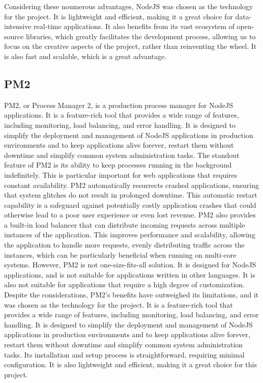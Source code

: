 Considering these noumerous advantages, NodeJS was chosen as the technology for the project. It is lightweight and efficient, making it a great choice for data-intensive real-time applications. It also benefits from its vast ecosystem of open-source libraries, which greatly facilitates the development process, allowing us to focus on the creative aspects of the project, rather than reinventing the wheel. It is also fast and scalable, which is a great advantage.


\subsection{PM2}
PM2, or Process Manager 2, is a production process manager for NodeJS applications. It is a feature-rich tool that provides a wide range of features, including monitoring, load balancing, and error handling. It is designed to simplify the deployment and management of NodeJS applications in production environments and to keep applications alive forever, restart
them without downtime and simplify common system administration tasks.
The standout feature of PM2 is its ability to keep processes running in the background indefinitely. This is particular important for web applications that requires constant availability. PM2 automatically resurrects crashed applications, ensuring that system glitches do not result in prolonged downtime.\cite{pm2}
This automatic restart capability is a safeguard against potentially costly application crashes that could otherwise lead to a poor user experience or even lost revenue. \cite{pm2}
PM2 also provides a built-in load balancer that can distribute incoming requests across multiple instances of the application. This improves performance and scalability, allowing the application to handle more requests, evenly distributing traffic across the instances, which can be particularly beneficial when running on multi-core systems. \cite{pm2LoadBalancing}
However, PM2 is not one-size-fits-all solution. It is designed for NodeJS applications, and is not suitable for applications written in other languages. It is also not suitable for applications that require a high degree of customization. \cite{pm2}
Despite the considerations, PM2's benefits have outweighed its limitations, and it was chosen as the technology for the project. It is a feature-rich tool that provides a wide range of features, including monitoring, load balancing, and error handling.
It is designed to simplify the deployment and management of NodeJS applications in production environments and to keep applications alive forever, restart them without downtime and simplify common system administration tasks.
Its installation and setup process is straightforward, requiring minimal configuration. It is also lightweight and efficient, making it a great choice for this project. \cite{tilkov}


